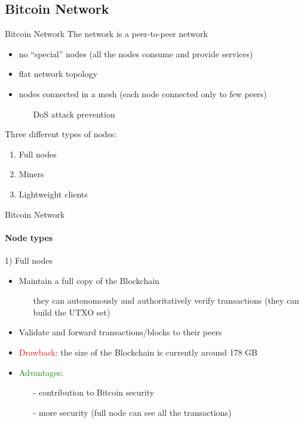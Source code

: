 \documentclass{beamer}
\begin{document}
  \subsection{Bitcoin Network}
  \begin{frame}{Bitcoin Network}
    The network is a peer-to-peer network
    \begin{itemize}
        \item no ``special'' nodes (all the nodes consume and provide services) 
        \item flat network topology
        \item nodes connected in a mesh (each node connected only to few peers)
        \begin{itemize}
            \item[\MVRightarrow] DoS attack prevention %
        \end{itemize}
    \end{itemize}
    
    Three different types of nodes:
    \begin{enumerate}
        \item Full nodes
        \item Miners
        \item Lightweight clients
    \end{enumerate}
    
  \end{frame}
  
  
  
  
  \begin{frame}{Bitcoin Network}
    \framesubtitle{Node types}
    \begin{block}{1) Full nodes}
        \begin{itemize}
            \item Maintain a full copy of the Blockchain
            \begin{itemize}
                \item[\MVRightarrow] they can autonomously and authoritatively verify transactions (they can build the UTXO set)
            \end{itemize}
            \item Validate and forward transactions/blocks to their peers 
            \item \textcolor{red}{Drawback}: the size of the Blockchain is currently around 178 GB \cite{statista}
            \item \textcolor{green}{Advantages}: 
            \begin{itemize}
                \item[-] contribution to Bitcoin security
                \item[-] more security (full node can see all the transactions) 
            \end{itemize}
        \end{itemize}
    \end{block}
  \end{frame}
  
\end{document}
